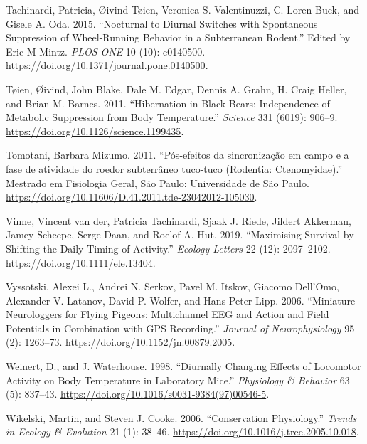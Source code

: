 \documentclass[msc,numbers,hidelinks]{coppe}
\newlength{\cslhangindent}
\newenvironment{cslreferences}%
  {\setlength{\parindent}{0pt}%
  \everypar{\setlength{\hangindent}{\cslhangindent}}\ignorespaces}%
  {\par}
\begin{document}
\begin{cslreferences}
  \leavevmode\hypertarget{ref-tachinardiNocturnalDiurnalSwitches2015}{}%
  Tachinardi, Patricia, Øivind Tøien, Veronica S. Valentinuzzi, C. Loren Buck, and Gisele A. Oda. 2015. ``Nocturnal to Diurnal Switches with Spontaneous Suppression of Wheel-Running Behavior in a Subterranean Rodent.'' Edited by Eric M Mintz. \emph{PLOS ONE} 10 (10): e0140500. \url{https://doi.org/10.1371/journal.pone.0140500}.

  \leavevmode\hypertarget{ref-toienHibernationBlackBears2011}{}%
  Tøien, Øivind, John Blake, Dale M. Edgar, Dennis A. Grahn, H. Craig Heller, and Brian M. Barnes. 2011. ``Hibernation in Black Bears: Independence of Metabolic Suppression from Body Temperature.'' \emph{Science} 331 (6019): 906--9. \url{https://doi.org/10.1126/science.1199435}.

  \leavevmode\hypertarget{ref-tomotaniPosefeitosSincronizacaoEm2011}{}%
  Tomotani, Barbara Mizumo. 2011. ``Pós-efeitos da sincronização em campo e a fase de atividade do roedor subterrâneo tuco-tuco (Rodentia: Ctenomyidae).'' Mestrado em Fisiologia Geral, São Paulo: Universidade de São Paulo. \url{https://doi.org/10.11606/D.41.2011.tde-23042012-105030}.

  \leavevmode\hypertarget{ref-vinneMaximisingSurvivalShifting2019}{}%
  Vinne, Vincent van der, Patricia Tachinardi, Sjaak J. Riede, Jildert Akkerman, Jamey Scheepe, Serge Daan, and Roelof A. Hut. 2019. ``Maximising Survival by Shifting the Daily Timing of Activity.'' \emph{Ecology Letters} 22 (12): 2097--2102. \url{https://doi.org/10.1111/ele.13404}.

  \leavevmode\hypertarget{ref-vyssotskiMiniatureNeurologgersFlying2006}{}%
  Vyssotski, Alexei L., Andrei N. Serkov, Pavel M. Itskov, Giacomo Dell'Omo, Alexander V. Latanov, David P. Wolfer, and Hans-Peter Lipp. 2006. ``Miniature Neurologgers for Flying Pigeons: Multichannel EEG and Action and Field Potentials in Combination with GPS Recording.'' \emph{Journal of Neurophysiology} 95 (2): 1263--73. \url{https://doi.org/10.1152/jn.00879.2005}.

  \leavevmode\hypertarget{ref-weinertDiurnallyChangingEffects1998}{}%
  Weinert, D., and J. Waterhouse. 1998. ``Diurnally Changing Effects of Locomotor Activity on Body Temperature in Laboratory Mice.'' \emph{Physiology \& Behavior} 63 (5): 837--43. \url{https://doi.org/10.1016/s0031-9384(97)00546-5}.

  \leavevmode\hypertarget{ref-wikelskiConservationPhysiology2006}{}%
  Wikelski, Martin, and Steven J. Cooke. 2006. ``Conservation Physiology.'' \emph{Trends in Ecology \& Evolution} 21 (1): 38--46. \url{https://doi.org/10.1016/j.tree.2005.10.018}.


\end{cslreferences}
\end{document}
